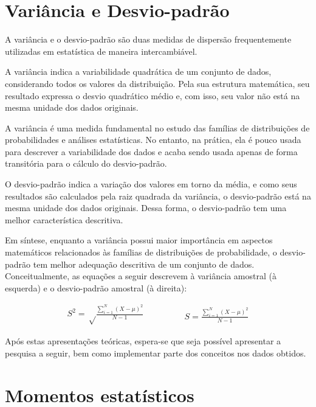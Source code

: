 \documentclass[
]{book}
\begin{document}
\hypertarget{variuxe2ncia-e-desvio-padruxe3o}{%
\section{Variância e Desvio-padrão}\label{variuxe2ncia-e-desvio-padruxe3o}}

A variância e o desvio-padrão são duas medidas de dispersão frequentemente utilizadas em estatística de maneira intercambiável.

A variância indica a variabilidade quadrática de um conjunto de dados, considerando todos os valores da distribuição. Pela sua estrutura matemática, seu resultado expressa o desvio quadrático médio e, com isso, seu valor não está na mesma unidade dos dados originais.

A variância é uma medida fundamental no estudo das famílias de distribuições de probabilidades e análises estatísticas. No entanto, na prática, ela é pouco usada para descrever a variabilidade dos dados e acaba sendo usada apenas de forma transitória para o cálculo do desvio-padrão.

O desvio-padrão indica a variação dos valores em torno da média, e como seus resultados são calculados pela raiz quadrada da variância, o desvio-padrão está na mesma unidade dos dados originais. Dessa forma, o desvio-padrão tem uma melhor característica descritiva.

Em síntese, enquanto a variância possui maior importância em aspectos matemáticos relacionados às famílias de distribuições de probabilidade, o desvio-padrão tem melhor adequação descritiva de um conjunto de dados. Conceitualmente, as equações a seguir descrevem à variância amostral (à esquerda) e o desvio-padrão amostral (à direita):

\begin{equation}
  \begin{split}
    S^2 = \sqrt\frac{\sum\limits_{i=1}^N (X -\mu)^2}{N-1}
  \end{split}
\qquad\qquad
  \begin{split}
    S = \frac{\sum\limits_{i=1}^N (X -\mu)^2}{N-1}
  \end{split}
\end{equation}

Após estas apresentações teóricas, espera-se que seja possível apresentar a pesquisa a seguir, bem como implementar parte dos conceitos nos dados obtidos.

\hypertarget{momentos-estatuxedsticos}{%
\section{Momentos estatísticos}\label{momentos-estatuxedsticos}}
\end{document}
